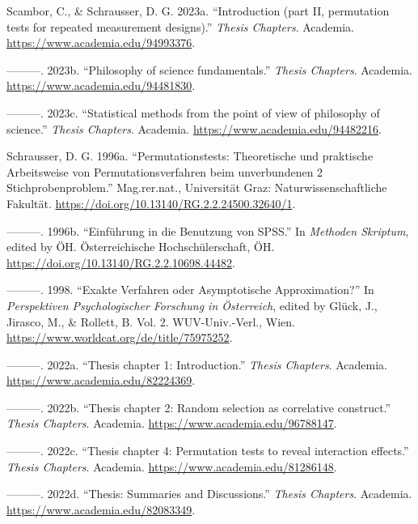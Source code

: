 \documentclass[
]{article}
\author{}
\date{}
\newlength{\cslhangindent}
\newlength{\cslentryspacingunit} %
\newenvironment{CSLReferences}[2] %
 {%
  \setlength{\parindent}{0pt}
  \ifodd #1
  \let\oldpar\par
  \def\par{\hangindent=\cslhangindent\oldpar}
  \fi
  \setlength{\parskip}{#2\cslentryspacingunit}
 }%
 {}
\begin{document}
\hypertarget{refs}{}
\begin{CSLReferences}{1}{0}
\leavevmode{}%
Scambor, C., \& Schrausser, D. G. 2023a. {``{Introduction (part II,
permutation tests for repeated measurement designs)}.''} \emph{Thesis
Chapters}. Academia. \url{https://www.academia.edu/94993376}.

\leavevmode{}%
---------. 2023b. {``{Philosophy of science fundamentals}.''}
\emph{Thesis Chapters}. Academia.
\url{https://www.academia.edu/94481830}.

\leavevmode{}%
---------. 2023c. {``{Statistical methods from the point of view of
philosophy of science}.''} \emph{Thesis Chapters}. Academia.
\url{https://www.academia.edu/94482216}.

\leavevmode{}%
Schrausser, D. G. 1996a. {``{Permutationstests: Theoretische und
praktische Arbeitsweise von Permutationsverfahren beim unverbundenen 2
Stichprobenproblem}.''} Mag.rer.nat., Universität Graz:
Naturwissenschaftliche Fakultät.
\url{https://doi.org/10.13140/RG.2.2.24500.32640/1}.

\leavevmode{}%
---------. 1996b. {``{Einführung in die Benutzung von SPSS}.''} In
\emph{Methoden Skriptum}, edited by ÖH. Österreichische
Hochschülerschaft, ÖH.
\url{https://doi.org/10.13140/RG.2.2.10698.44482}.

\leavevmode{}%
---------. 1998. {``{Exakte Verfahren oder Asymptotische
Approximation?}''} In \emph{Perspektiven Psychologischer Forschung in
Österreich}, edited by Glück, J., Jirasco, M., \& Rollett, B. Vol. 2.
WUV-Univ.-Verl., Wien. \url{https://www.worldcat.org/de/title/75975252}.

\leavevmode{}%
---------. 2022a. {``{Thesis chapter 1: Introduction}.''} \emph{Thesis
Chapters}. Academia. \url{https://www.academia.edu/82224369}.

\leavevmode{}%
---------. 2022b. {``{Thesis chapter 2: Random selection as correlative
construct}.''} \emph{Thesis Chapters}. Academia.
\url{https://www.academia.edu/96788147}.

\leavevmode{}%
---------. 2022c. {``{Thesis chapter 4: Permutation tests to reveal
interaction effects}.''} \emph{Thesis Chapters}. Academia.
\url{https://www.academia.edu/81286148}.

\leavevmode{}%
---------. 2022d. {``{Thesis: Summaries and Discussions}.''}
\emph{Thesis Chapters}. Academia.
\url{https://www.academia.edu/82083349}.

\end{CSLReferences}
\end{document}
